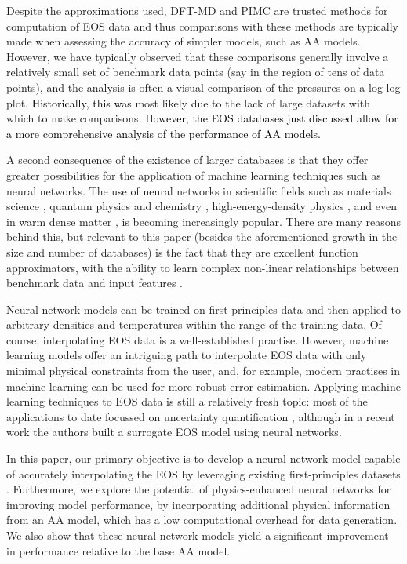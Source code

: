 \documentclass[%
 preprint,
 superscriptaddress,
 amsmath,amssymb,
longbibliography,
]{revtex4-2}
\newcommand{\change}[1]{\textcolor{black}{#1}}
\begin{document}
Despite the approximations used, DFT-MD and PIMC are trusted methods for computation of EOS data and thus comparisons with these methods are typically made when assessing the accuracy of simpler models, such as AA models. 
However, we have typically observed that these comparisons generally involve a relatively small set of benchmark data points (say in the region of tens of data points), and the analysis is often a visual comparison of the pressures on a log-log plot. \change{Historically, this was} most likely due to the lack of large datasets with which to make comparisons. \change{However, the EOS databases just discussed \cite{Militzer_EOS_database,Hu_Be_EOS} allow for a more comprehensive analysis of the performance of AA models.} 

A second consequence of the existence of larger databases is that they offer greater possibilities for the application of machine learning techniques such as neural networks. The use of neural networks in scientific fields such as materials science \cite{NN_physics_1,Lenz_ML_review}, quantum physics and chemistry \cite{Burke_ML_1,Burke_ML_2,DeepMind_DFT,DeepMind_schrodinger,Troyer_ML}, high-energy-density physics \cite{hatfield2021_thedata-driven}, and even in warm dense matter \cite{Dornheim_ESA,mala,fiedler2022_training-free}, is becoming increasingly popular. There are many reasons behind this, but relevant to this paper (besides the aforementioned growth in the size and number of databases) is the fact that they are excellent function approximators, with the ability to learn complex non-linear relationships between benchmark data and input features \cite{Goodfellow-et-al-2016,nns_functions}. 

Neural network models can be trained on first-principles data and then applied to arbitrary densities and temperatures within the range of the training data. Of course, interpolating EOS data is a well-established practise. However, machine learning models offer an intriguing path to interpolate EOS data with only minimal physical constraints from the user, and, for example, modern practises in machine learning can be used for more robust error estimation. Applying machine learning techniques to EOS data is still a relatively fresh topic: most of the applications to date focussed on uncertainty quantification \cite{Kraus_EOS_uncertainty,gaffney2022constraining,Lindquist_EOS_uncertainty}, although in a recent work \cite{Mentzer_EOS_neural} the authors built a surrogate EOS model using neural networks.
 

In this paper, our primary objective is to develop a neural network model capable of accurately interpolating the EOS by leveraging existing first-principles datasets \cite{Militzer_EOS_database,Hu_Be_EOS}. Furthermore, we explore the potential of physics-enhanced neural networks for improving model performance, by incorporating additional physical information from an AA model, which has a low computational overhead for data generation. We also show that these neural network models yield a significant improvement in performance relative to the base AA model.
\end{document}
